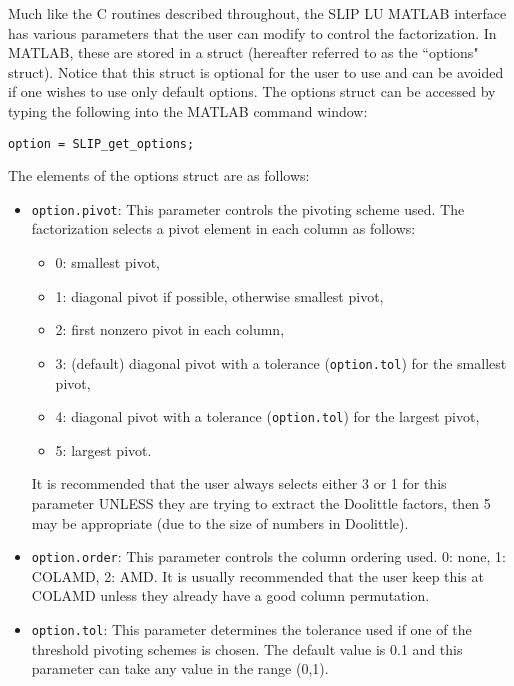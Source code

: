 \documentclass[12pt]{article}
\theoremstyle{definition}
\begin{document}
Much like the C routines described throughout, the SLIP LU MATLAB interface has
various parameters that the user can modify to control the factorization. In
MATLAB, these are stored in a struct (hereafter referred to as the ``options"
struct). Notice that this struct is optional for the
user to use and can be avoided if one wishes to use only default options. The
options struct can be accessed by typing the following into the MATLAB command
window:

\verb|option = SLIP_get_options;|

The elements of the options struct are as follows:

\begin{itemize}

\item \verb|option.pivot|: This parameter controls the pivoting scheme used.
The factorization selects a pivot element in each column as follows:

    \begin{itemize}
    \item 0: smallest pivot,
    \item 1: diagonal pivot if possible, otherwise smallest pivot,
    \item 2: first nonzero pivot in each column,
    \item 3: (default) diagonal pivot with a tolerance (\verb|option.tol|)
        for the smallest pivot,
    \item 4: diagonal pivot with a tolerance (\verb|option.tol|)
        for the largest pivot,
    \item 5: largest pivot.
    \end{itemize}

It is recommended that the user always selects either 3 or 1 for this parameter
UNLESS they are trying to extract the Doolittle factors, then 5 may be
appropriate (due to the size of numbers in Doolittle).

\item \verb|option.order|: This parameter controls the column ordering used.
0: none, 1: COLAMD, 2: AMD. It is usually recommended that the user keep this
at COLAMD unless they already have a good column permutation.

\item \verb|option.tol|: This parameter determines the tolerance used if one of
the threshold pivoting schemes is chosen. The default value is 0.1 and this
parameter can take any value in the range (0,1).

\end{itemize}
\end{document}
